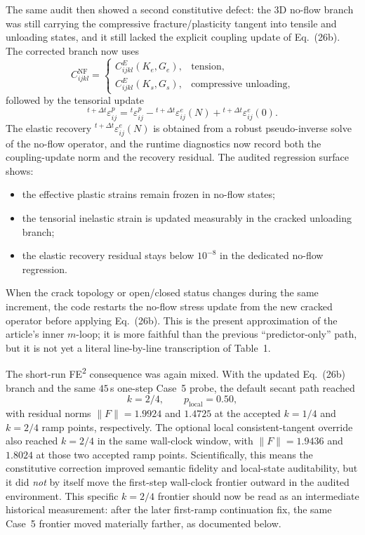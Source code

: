 The same audit then showed a second constitutive defect: the 3D no-flow branch
was still carrying the compressive fracture/plasticity tangent into tensile and
unloading states, and it still lacked the explicit coupling update of
Eq.~(26b).  The corrected branch now uses
\begin{equation}
  C_{ijkl}^{\mathrm{NF}}
  =
  \begin{cases}
    C_{ijkl}^{E}(K_e,G_e), & \text{tension}, \\
    C_{ijkl}^{E}(K_s,G_s), & \text{compressive unloading},
  \end{cases}
\end{equation}
followed by the tensorial update
\begin{equation}
  {}^{t+\Delta t}\!\varepsilon^{p}_{ij}
  =
  {}^{t}\!\varepsilon^{p}_{ij}
  -
  {}^{t+\Delta t}\!\varepsilon^{e}_{ij}(N)
  +
  {}^{t+\Delta t}\!\varepsilon^{e}_{ij}(0).
\end{equation}
The elastic recovery
\({}^{t+\Delta t}\!\varepsilon^{e}_{ij}(N)\) is obtained from a robust
pseudo-inverse solve of the no-flow operator, and the runtime diagnostics now
record both the coupling-update norm and the recovery residual.  The audited
regression surface shows:
\begin{itemize}
  \item the effective plastic strains remain frozen in no-flow states;
  \item the tensorial inelastic strain is updated measurably in the cracked
    unloading branch;
  \item the elastic recovery residual stays below \(10^{-8}\) in the dedicated
    no-flow regression.
\end{itemize}

When the crack topology or open/closed status changes during the same
increment, the code restarts the no-flow stress update from the new cracked
operator before applying Eq.~(26b).  This is the present approximation of the
article's inner \(m\)-loop; it is more faithful than the previous
``predictor-only'' path, but it is not yet a literal line-by-line transcription
of Table~1.

The short-run FE\textsuperscript{2} consequence was again mixed.  With the
updated Eq.~(26b) branch and the same \(45\)\,s one-step Case~5 probe, the
default secant path reached
\[
  k = 2/4,\qquad p_{\mathrm{local}} = 0.50,
\]
with residual norms
\(\|F\| = 1.9924\) and \(1.4725\) at the accepted
\(k=1/4\) and \(k=2/4\) ramp points, respectively.  The optional local
consistent-tangent override also reached \(k=2/4\) in the same wall-clock
window, with
\(\|F\| = 1.9436\) and \(1.8024\) at those two accepted ramp points.
Scientifically, this means the constitutive correction improved semantic
fidelity and local-state auditability, but it did \emph{not} by itself move the
first-step wall-clock frontier outward in the audited environment.  This
specific \(k=2/4\) frontier should now be read as an intermediate historical
measurement: after the later first-ramp continuation fix, the same Case~5
frontier moved materially farther, as documented below.

